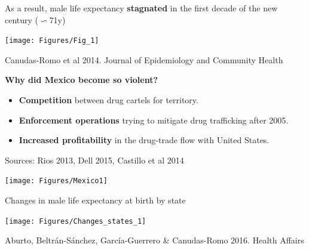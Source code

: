 \documentclass[xcolor={dvipsnames}]{beamer}
\begin{document}
\begin{frame}
	\begin{center}
		\Large{	As a result, male life expectancy \textbf{stagnated} in the first decade of the new century ($\backsim 	$71y)}
	\end{center}
		
	\begin{center}
		\texttt{[image: Figures/Fig\_1]}
	\end{center}

	\tiny{Canudas-Romo et al 2014. Journal of Epidemiology and Community Health}
	
\end{frame}



\begin{frame}
	\huge{
	\begin{center}
		\bf{Why did Mexico become so violent?}
	\end{center}
	}
	
	\pause
	
	\LARGE{
		\begin{itemize}
		
			\item \textbf{Competition} between drug cartels for territory. \pause
		
			\item \textbf{Enforcement operations} trying to mitigate drug trafficking after 2005. \pause
		
    	    \item \textbf{Increased profitability} in the drug-trade flow with United States. 
		
		\end{itemize}
		
	\tiny{Sources: Rios 2013, Dell 2015, Castillo et al 2014}
	}

\end{frame}



\begin{frame}

	\begin{center}
		\texttt{[image: Figures/Mexico1]}
	\end{center}
				
\end{frame}




\begin{frame}
	\Large{Changes in male life expectancy at birth by state}


	\begin{center}
		\texttt{[image: Figures/Changes\_states\_1]}
	\end{center}
	
	\tiny{Aburto, Beltr\'an-S\'anchez, Garc\'ia-Guerrero \& Canudas-Romo 2016. Health Affairs}				
\end{frame}
\end{document}
